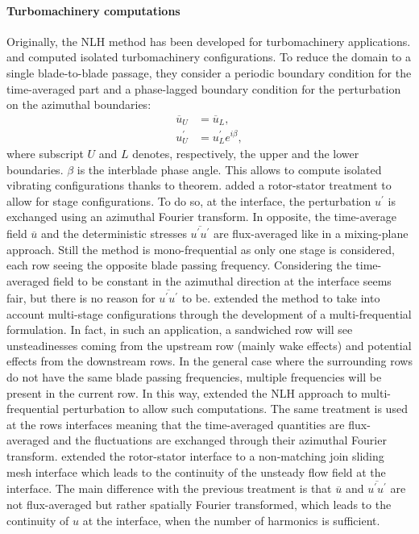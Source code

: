 \paragraph{Turbomachinery computations}
Originally, the NLH method has been developed for 
turbomachinery applications. \citet{He1998} and
\citet{Ning1998} computed isolated turbomachinery
configurations. To reduce the domain to a single 
blade-to-blade passage, they consider a periodic
boundary condition for the time-averaged part and a
phase-lagged boundary condition for the perturbation on the
azimuthal boundaries:
\begin{equation}
    \begin{split}
    	\overline{u}_U &= \overline{u}_L, \\
    	u^\prime_U &= u^\prime_L e^{i \beta},
    \end{split}
\end{equation}
where subscript $U$ and $L$ denotes, respectively, 
the upper and the lower boundaries. $\beta$ is the
interblade phase angle. This allows to compute
isolated vibrating configurations thanks to 
\citet{Lane1956} theorem.
\citet{Chen2001} added a rotor-stator treatment
to allow for stage configurations. 
To do so, at the interface, the perturbation 
$u^\prime$ is exchanged using
an azimuthal Fourier transform. In opposite,
the time-average field $\overline{u}$ 
and the deterministic stresses 
$\overline{u^\prime u^\prime}$
are flux-averaged like in a mixing-plane approach.
Still the method is mono-frequential as only
one stage is considered, each row seeing the
opposite blade passing frequency. Considering
the time-averaged field to be constant in the azimuthal 
direction at the interface seems fair, but there is
no reason for $\overline{u^\prime u^\prime}$ to be.
\citet{He2002} extended the method to take into
account multi-stage configurations through the
development of a multi-frequential formulation.
In fact, in such an application, 
a sandwiched row will see unsteadinesses coming
from the upstream row (mainly wake effects) and
potential effects from the downstream rows. In the
general case where the surrounding rows do not have the
same blade passing frequencies, multiple frequencies
will be present in the current row. 
In this way, \citet{He2002} extended the NLH approach to
multi-frequential perturbation to allow such computations.
The same treatment is used at the rows interfaces meaning
that the time-averaged quantities are flux-averaged and the
fluctuations are exchanged through their azimuthal
Fourier transform.
\citet{Vilmin2006} extended the rotor-stator
interface to a non-matching join sliding mesh interface which
leads to the continuity of the unsteady flow field at the interface.
The main difference with the previous treatment is that
$\overline{u}$ and $\overline{u^\prime u^\prime}$ 
are not flux-averaged but rather spatially Fourier transformed,
which leads to the continuity of $u$ at the interface, when
the number of harmonics is sufficient.

